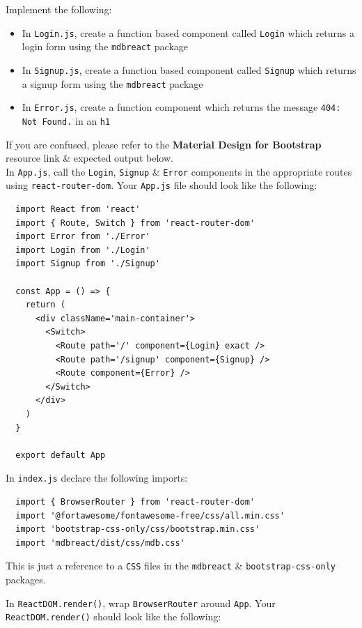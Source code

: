 \documentclass{article}
\begin{document}
Implement the following:
\begin{itemize}
  \item In \texttt{Login.js}, create a function based component called \texttt{Login} which returns a login form using the \texttt{mdbreact} package
  \item In \texttt{Signup.js}, create a function based component called \texttt{Signup} which returns a signup form using the \texttt{mdbreact} package
  \item In \texttt{Error.js}, create a function component which returns the message \texttt{404: Not Found.} in an \texttt{h1}
\end{itemize}

If you are confused, please refer to the \textbf{Material Design for Bootstrap} resource link \& expected output below. \\

In \texttt{App.js}, call the \texttt{Login}, \texttt{Signup} \& \texttt{Error} components in the appropriate routes using \texttt{react-router-dom}. Your \texttt{App.js} file should look like the following:

\begin{verbatim}
  import React from 'react'
  import { Route, Switch } from 'react-router-dom'
  import Error from './Error'
  import Login from './Login'
  import Signup from './Signup'
  
  const App = () => {
    return (
      <div className='main-container'>
        <Switch>
          <Route path='/' component={Login} exact />
          <Route path='/signup' component={Signup} />
          <Route component={Error} />
        </Switch>
      </div>
    )
  }
  
  export default App   
\end{verbatim}

In \texttt{index.js} declare the following imports:

\begin{verbatim}
  import { BrowserRouter } from 'react-router-dom'
  import '@fortawesome/fontawesome-free/css/all.min.css'
  import 'bootstrap-css-only/css/bootstrap.min.css'
  import 'mdbreact/dist/css/mdb.css'
\end{verbatim}

This is just a reference to a \texttt{CSS} files in the \texttt{mdbreact} \& \texttt{bootstrap-css-only} packages.

In \texttt{ReactDOM.render()}, wrap \texttt{BrowserRouter} around \texttt{App}. Your \texttt{ReactDOM.render()} should look like the following:
\end{document}
